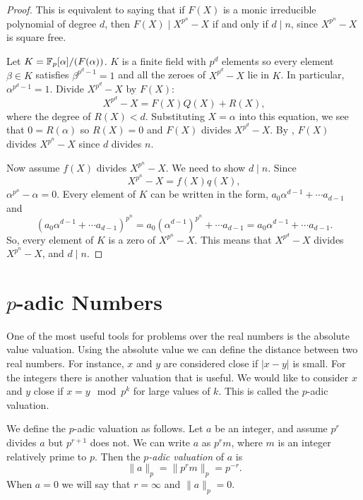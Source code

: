 \begin{proof}
This is equivalent to saying that if $F(X)$ is a monic irreducible
polynomial of degree $d$, then $F(X) \mid X^{p^n}-X$ if and only if
$d\mid n$, since $X^{p^n} -X$ is square free.

Let $K = \mathbb{F}_p[\alpha]/(F(\alpha))$.  $K$ is a finite field with $p^d$
elements so every element  $\beta \in K$ satisfies $\beta^{p^d-1} = 1$
and all the zeroes of $X^{p^d}-X$ lie in $K$.  In particular,
$\alpha^{p^d-1} = 1$.  Divide $X^{p^d}-X$ by $F(X)$:
\[
X^{p^d}-X = F(X) Q(X) + R(X),
\]
where the degree of $R(X) < d$.  Substituting $X = \alpha$ into this
equation, we see that $0 = R(\alpha)$ so $R(X) = 0$ and $F(X)$ divides
$X^{p^d}-X$.  By , $F(X)$ divides
$X^{p^n}-X$ since $d$ divides $n$.

Now assume $f(X)$ divides $X^{p^n}-X$.  We need to show $d \mid n$.
Since
\[
X^{p^n}-X = f(X) q(X),
\]
$\alpha^{p^n}-\alpha = 0$.  Every element of $K$ can be written in the
form, $a_0 \alpha^{d-1} + \cdots a_{d-1}$ and
\[
  (a_0 \alpha^{d-1} + \cdots a_{d-1})^{p^n}  =
a_0 (\alpha^{d-1})^{p^n} + \cdots a_{d-1}
= a_0 \alpha^{d-1} + \cdots a_{d-1}.
\]
So, every element of $K$ is a zero of $X^{p^n} -X$.  This means that
$X^{p^d}-X$ divides $X^{p^n}-X$, and $d\mid n$.
\end{proof}

\section{\texorpdfstring{$p$}{p}-adic Numbers}
\label{padic:Arith:Sec}


One of the most useful tools for problems over the real numbers is the
absolute value valuation.  Using the absolute value we can define the
distance between two real numbers. For instance, $x$ and $y$ are
considered close if $|x - y|$ is small.  For the integers there is
another valuation that is useful.  We would like to consider $x$ and
$y$ close if $x=y \mod{p^k}$ for large values of $k$. This is called
the $p$-adic valuation.

We define the $p$-adic valuation as follows.  Let $a$ be an integer,
and assume $p^r$ divides $a$ but $p^{r+1}$ does not.  We can write $a$
as $p^r m$, where $m$ is an integer relatively prime to $p$.  Then the
{\em $p$-adic valuation}
of $a$ is
\[
 \| a \|_p = \| p^r m \|_p = p^{-r}.
\]
When $a=0$ we will say that $r = \infty$ and $\|a\|_p = 0$.

